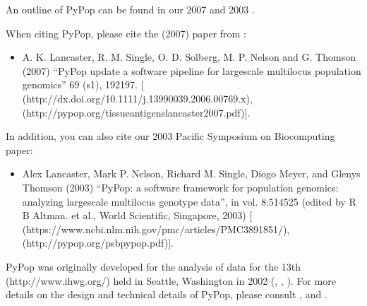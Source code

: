 \documentclass[letterpaper,10pt,english,openany,oneside]{sphinxmanual}
\begin{document}
\sphinxAtStartPar
An outline of PyPop can be found in our 2007  and
2003  .

\sphinxAtStartPar
{}

\sphinxAtStartPar
When citing PyPop, please cite the (2007) paper from :
\begin{itemize}
\item {} 
\sphinxAtStartPar
A. K. Lancaster, R. M. Single, O. D. Solberg, M. P. Nelson and
G. Thomson (2007) “PyPop update \sphinxhyphen{} a software pipeline for
large\sphinxhyphen{}scale multilocus population genomics”  69 (s1), 192\sphinxhyphen{}197.
{[} (http://dx.doi.org/10.1111/j.1399\sphinxhyphen{}0039.2006.00769.x),
 (http://pypop.org/tissue\sphinxhyphen{}antigens\sphinxhyphen{}lancaster\sphinxhyphen{}2007.pdf){]}.

\end{itemize}

\sphinxAtStartPar
In addition, you can also cite our 2003 Pacific Symposium on Biocomputing paper:
\begin{itemize}
\item {} 
\sphinxAtStartPar
Alex Lancaster, Mark P. Nelson, Richard M. Single, Diogo Meyer, and
Glenys Thomson (2003) “PyPop: a software framework for population
genomics: analyzing large\sphinxhyphen{}scale multi\sphinxhyphen{}locus genotype data”, in
 vol. 8:514\sphinxhyphen{}525 (edited by R B
Altman. et al., World Scientific, Singapore, 2003) {[} (https://www.ncbi.nlm.nih.gov/pmc/articles/PMC3891851/),
 (http://pypop.org/psb\sphinxhyphen{}pypop.pdf){]}.

\end{itemize}

\sphinxAtStartPar
PyPop was originally developed for the analysis of data for the 13th
 (http://www.ihwg.org/) held in Seattle, Washington in 2002
(, , ). For more
details on the design and technical details of PyPop, please consult
,  and .
\end{document}

